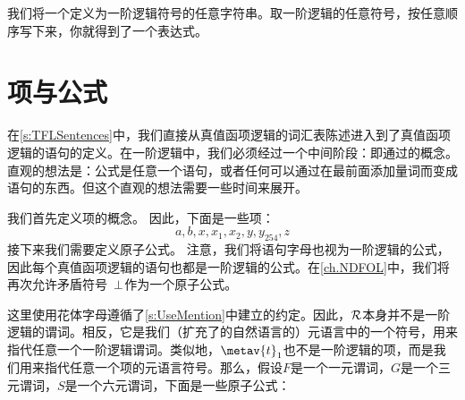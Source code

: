 我们将一个定义为一阶逻辑符号的任意字符串。取一阶逻辑的任意符号，按任意顺序写下来，你就得到了一个表达式。

\section{项与公式}
\label{s:TermsFormulas}

在\cref{s:TFLSentences}中，我们直接从真值函项逻辑的词汇表陈述进入到了真值函项逻辑的语句的定义。在一阶逻辑中，我们必须经过一个中间阶段：即通过的概念。直观的想法是：公式是任意一个语句，或者任何可以通过在最前面添加量词而变成语句的东西。但这个直观的想法需要一些时间来展开。

我们首先定义项的概念。
因此，下面是一些项：
	$$a, b, x, x_1, x_2, y, y_{254}, z$$
接下来我们需要定义原子公式。
注意，我们将语句字母也视为一阶逻辑的公式，因此每个真值函项逻辑的语句也都是一阶逻辑的公式。在\cref{ch.NDFOL}中，我们将再次允许矛盾符号~$\bot$作为一个原子公式。



这里使用花体字母遵循了\cref{s:UseMention}中建立的约定。因此，$\mathcal{R}$本身并不是一阶逻辑的谓词。相反，它是我们（扩充了的自然语言的）元语言中的一个符号，用来指代任意一个一阶逻辑谓词。类似地，$\metav{t}_1$也不是一阶逻辑的项，而是我们用来指代任意一个项的元语言符号。那么，假设$F$是一个一元谓词，$G$是一个三元谓词，$S$是一个六元谓词，下面是一些原子公式：


